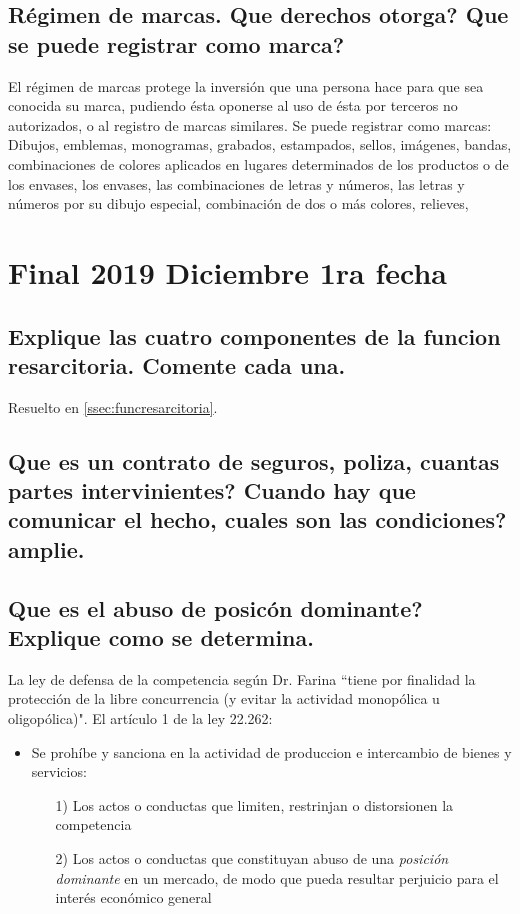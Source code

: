 \documentclass{article}
\begin{document}
\subsection{Régimen de marcas. Que derechos otorga? Que se puede registrar como marca?}
El régimen de marcas protege la inversión que una persona hace para que sea conocida su marca, pudiendo ésta oponerse al uso de ésta por terceros no autorizados, o al registro de marcas similares. Se puede registrar como marcas: Dibujos, emblemas, monogramas, grabados, estampados, sellos, imágenes, bandas, combinaciones de colores aplicados en lugares determinados de los productos o de los envases, los envases, las combinaciones de letras y números, las letras y números por su dibujo especial, combinación de dos o más colores, relieves, 

\section{Final 2019 Diciembre 1ra fecha}
\subsection{Explique las cuatro componentes de la funcion resarcitoria. Comente cada una.}
Resuelto en \ref{ssec:funcresarcitoria}.

\subsection{Que es un contrato de seguros, poliza, cuantas partes intervinientes? Cuando hay que comunicar el hecho, cuales son las condiciones? amplie.}


\subsection{Que es el abuso de posic\'on dominante? Explique como se determina.}

La ley de defensa de la competencia seg\'un Dr. Farina ``tiene por finalidad la protección de la libre concurrencia (y evitar la actividad monopólica u oligopólica)"{}. El art\'iculo 1 de la ley 22.262:

\begin{itemize}
	\item Se prohíbe y sanciona en la actividad de produccion e intercambio de bienes y servicios:
	\begin{itemize}
		\item[1)] Los actos o conductas que limiten, restrinjan o distorsionen la competencia
		\item[2)] Los actos o conductas que constituyan abuso de una \textit{posición dominante} en un mercado, de modo que pueda resultar perjuicio para el interés económico general
	\end{itemize}
\end{itemize}
\end{document}

